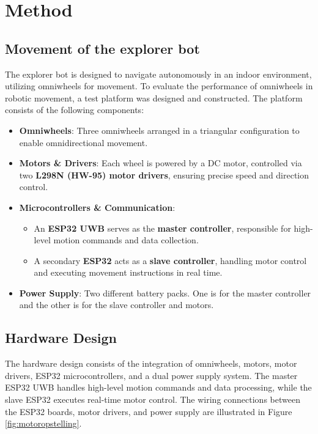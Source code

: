 \section{Method}


\subsection{Movement of the explorer bot}
The explorer bot is designed to navigate autonomously in an indoor environment, utilizing omniwheels for movement.
To evaluate the performance of omniwheels in robotic movement, a test platform was designed and constructed. The platform consists of the following components:

\begin{itemize}
    \item \textbf{Omniwheels}: Three omniwheels arranged in a triangular configuration to enable omnidirectional movement.
    \item \textbf{Motors \& Drivers}: Each wheel is powered by a DC motor, controlled via two \textbf{L298N (HW-95) motor drivers}, ensuring precise speed and direction control.
    \item \textbf{Microcontrollers \& Communication}:
    \begin{itemize}
        \item An \textbf{ESP32 UWB} serves as the \textbf{master controller}, responsible for high-level motion commands and data collection.
        \item A secondary \textbf{ESP32} acts as a \textbf{slave controller}, handling motor control and executing movement instructions in real time.
    \end{itemize}
    \item \textbf{Power Supply}: Two different battery packs. One is for the master controller and the other is for the slave controller and motors.
\end{itemize}

\subsection{Hardware Design}

The hardware design consists of the integration of omniwheels, motors, motor drivers, ESP32 microcontrollers, and a dual power supply system. The master ESP32 UWB handles high-level motion commands and data processing, while the slave ESP32 executes real-time motor control. The wiring connections between the ESP32 boards, motor drivers, and power supply are illustrated in Figure \ref{fig:motoropstelling}.

